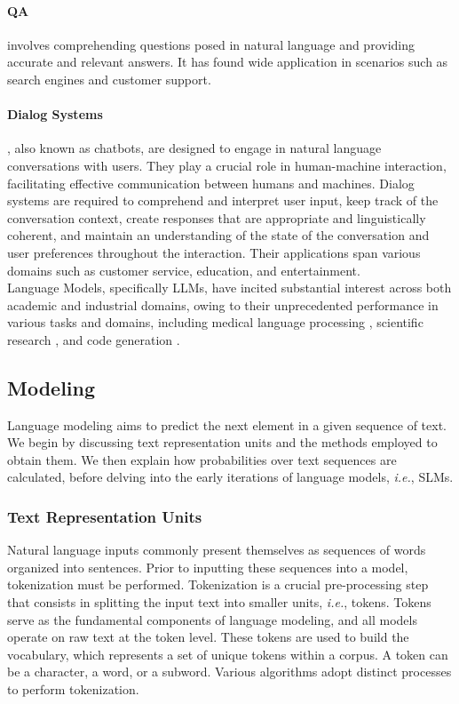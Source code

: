 \paragraph{\ac{QA}} involves comprehending questions posed in natural language and providing accurate and relevant answers. It has found wide application in scenarios such as search engines and customer support.

\paragraph{Dialog Systems}, also known as chatbots, are designed to engage in natural language conversations with users. They play a crucial role in human-machine interaction, facilitating effective communication between humans and machines. Dialog systems are required to comprehend and interpret user input, keep track of the conversation context, create responses that are appropriate and linguistically coherent, and maintain an understanding of the state of the conversation and user preferences throughout the interaction. Their applications span various domains such as customer service, education, and entertainment. \\

Language Models, specifically \acp{LLM}, have incited substantial interest across both academic and industrial domains, owing to their unprecedented performance in various tasks and domains, including medical language processing \citep{thirunavukarasu2023large}, scientific research \citep{wang2023scientific}, and code generation \citep{xu2022systematic}.

\subsection{Modeling}

Language modeling aims to predict the next element in a given sequence of text. We begin by discussing text representation units and the methods employed to obtain them. We then explain how probabilities over text sequences are calculated, before delving into the early iterations of language models, \textit{i.e.}, \acp{SLM}.

\subsubsection{Text Representation Units}

Natural language inputs commonly present themselves as sequences of words organized into sentences. Prior to inputting these sequences into a model, tokenization must be performed. Tokenization is a crucial pre-processing step that consists in splitting the input text into smaller units, \textit{i.e.}, tokens. Tokens serve as the fundamental components of language modeling, and all models operate on raw text at the token level. These tokens are used to build the vocabulary, which represents a set of unique tokens within a corpus. A token can be a character, a word, or a subword. Various algorithms adopt distinct processes to perform tokenization. 

